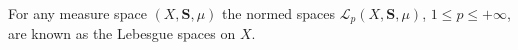 For any measure space $(X, \mathbf{S}, \mu)$ the normed spaces $\mathcal{L}_p(X, \mathbf{S}, \mu)$, $1 \leq p \leq +\infty$, are known as the Lebesgue spaces on $X$.
